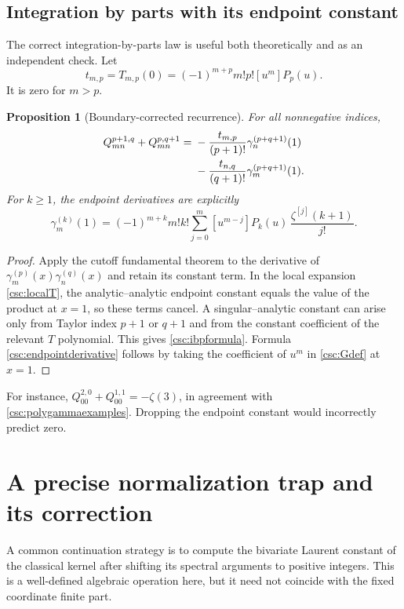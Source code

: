 \documentclass[11pt,a4paper]{article}
\numberwithin{equation}{section}
\newtheorem{proposition}[theorem]{Proposition}
\theoremstyle{definition}
\begin{document}
\subsection{Integration by parts with its endpoint constant}\label{csc:ibp-section}
The correct integration-by-parts law is useful both theoretically and as an independent check. Let
\begin{equation}\label{csc:tconstant}
t_{m,p}=T_{m,p}(0)=(-1)^{m+p}m!p![u^m]P_p(u).
\end{equation}
It is zero for $m>p$.
\begin{proposition}[Boundary-corrected recurrence]\label{csc:ibp}
For all nonnegative indices,
\begin{align}
Q_{mn}^{p+1,q}+Q_{mn}^{p,q+1}
={}&-\frac{t_{m,p}}{(p+1)!}\gamma_n^{(p+q+1)}(1)\notag\\
&-\frac{t_{n,q}}{(q+1)!}\gamma_m^{(p+q+1)}(1).\label{csc:ibpformula}
\end{align}
For $k\ge1$, the endpoint derivatives are explicitly
\begin{equation}\label{csc:endpointderivative}
\gamma_m^{(k)}(1)=(-1)^{m+k}m!k!
\sum_{j=0}^m[u^{m-j}]P_k(u)\,\frac{\zeta^{[j]}(k+1)}{j!}.
\end{equation}
\end{proposition}
\begin{proof}
Apply the cutoff fundamental theorem to the derivative of
$\gamma_m^{(p)}(x)\gamma_n^{(q)}(x)$ and retain its constant term. In the local expansion \eqref{csc:localT}, the analytic--analytic endpoint constant equals the value of the product at $x=1$, so these terms cancel. A singular--analytic constant can arise only from Taylor index $p+1$ or $q+1$ and from the constant coefficient of the relevant $T$ polynomial. This gives \eqref{csc:ibpformula}. Formula \eqref{csc:endpointderivative} follows by taking the coefficient of $u^m$ in \eqref{csc:Gdef} at $x=1$.
\end{proof}
For instance, $Q_{00}^{2,0}+Q_{00}^{1,1}=-\zeta(3)$, in agreement with \eqref{csc:polygammaexamples}. Dropping the endpoint constant would incorrectly predict zero.

\section{A precise normalization trap and its correction}\label{csc:normalization}
A common continuation strategy is to compute the bivariate Laurent constant of the classical kernel after shifting its spectral arguments to positive integers. This is a well-defined algebraic operation here, but it need not coincide with the fixed coordinate finite part.
\end{document}
